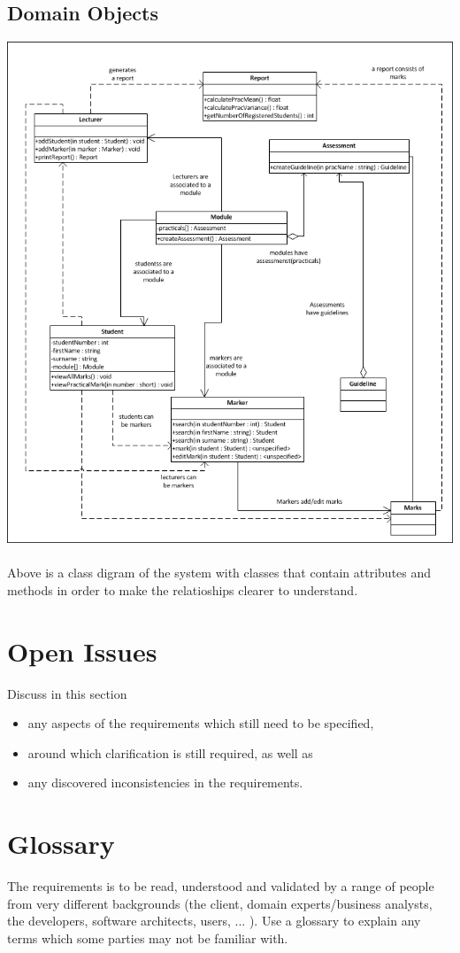 \documentclass[11pt,a4paper]{article}
\begin{document}
\subsection{Domain Objects}
\includegraphics[width=1.0\linewidth]{Class_Diagram}
\\\\
Above is a class digram of the system with classes that contain attributes and methods in order to make the relatioships clearer to understand. 
\section{Open Issues}
Discuss in this section
\begin{itemize}
\item any aspects of the requirements which still need to be specified,
\item around which clarification is still required, as well as
\item any discovered inconsistencies in the requirements.
\end{itemize}
\section{Glossary}
The requirements is to be read, understood and validated by a range of people from very different backgrounds (the client, domain experts/business analysts, the developers, software architects, users, ... ). Use a glossary to explain any terms which some parties may not be familiar with.
\end{document}
